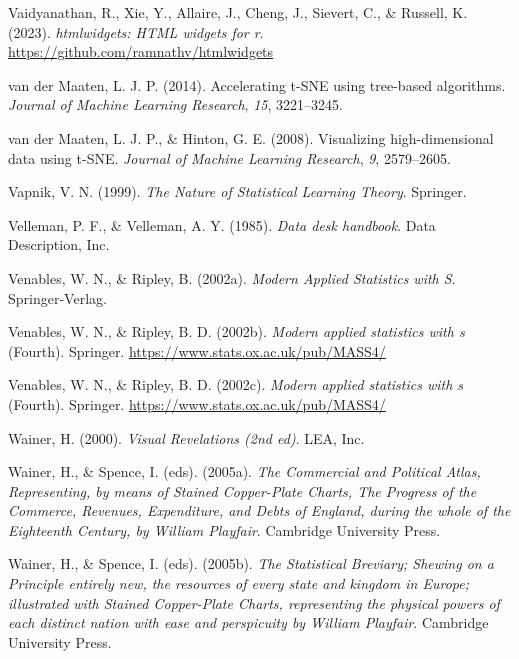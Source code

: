 \documentclass[
  letterpaper,
]{krantz}
\newlength{\cslhangindent}
\newenvironment{CSLReferences}[2] %
 {\begin{list}{}{%
  \setlength{\itemindent}{0pt}
  \setlength{\leftmargin}{0pt}
  \setlength{\parsep}{0pt}
  \ifodd #1
   \setlength{\leftmargin}{\cslhangindent}
   \setlength{\itemindent}{-1\cslhangindent}
  \fi
  \setlength{\itemsep}{#2\baselineskip}}}
 {\end{list}}
\begin{document}
\begin{CSLReferences}{1}{0}
Vaidyanathan, R., Xie, Y., Allaire, J., Cheng, J., Sievert, C., \&
Russell, K. (2023). \emph{{htmlwidgets}: HTML widgets for r}.
\url{https://github.com/ramnathv/htmlwidgets}

van der Maaten, L. J. P. (2014). Accelerating t-SNE using tree-based
algorithms. \emph{Journal of Machine Learning Research}, \emph{15},
3221--3245.

van der Maaten, L. J. P., \& Hinton, G. E. (2008). Visualizing
high-dimensional data using t-SNE. \emph{Journal of Machine Learning
Research}, \emph{9}, 2579--2605.

Vapnik, V. N. (1999). \emph{The {N}ature of {S}tatistical {L}earning
{T}heory}. Springer.

Velleman, P. F., \& Velleman, A. Y. (1985). \emph{Data desk handbook}.
Data Description, Inc.

Venables, W. N., \& Ripley, B. (2002a). \emph{Modern {A}pplied
{S}tatistics with {S}}. Springer-Verlag.

Venables, W. N., \& Ripley, B. D. (2002b). \emph{Modern applied
statistics with s} (Fourth). Springer.
\url{https://www.stats.ox.ac.uk/pub/MASS4/}

Venables, W. N., \& Ripley, B. D. (2002c). \emph{Modern applied
statistics with s} (Fourth). Springer.
\url{https://www.stats.ox.ac.uk/pub/MASS4/}

Wainer, H. (2000). \emph{Visual {R}evelations (2nd ed)}. LEA, Inc.

Wainer, H., \& Spence, I. (eds). (2005a). \emph{The {C}ommercial and
{P}olitical {A}tlas, {R}epresenting, by means of {S}tained
{C}opper-{P}late {C}harts, {T}he {P}rogress of the {C}ommerce,
{R}evenues, {E}xpenditure, and {D}ebts of {E}ngland, during the whole of
the {E}ighteenth {C}entury, by {W}illiam {P}layfair}. Cambridge
University Press.

Wainer, H., \& Spence, I. (eds). (2005b). \emph{The {S}tatistical
{B}reviary; {S}hewing on a {P}rinciple entirely new, the resources of
every state and kingdom in {E}urope; illustrated with {S}tained
{C}opper-{P}late {C}harts, representing the physical powers of each
distinct nation with ease and perspicuity by {W}illiam {P}layfair}.
Cambridge University Press.


\end{CSLReferences}
\end{document}
